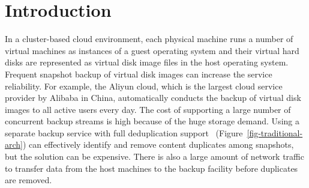 \section{Introduction}
In a cluster-based cloud environment,
each physical machine runs a number  of virtual machines as  instances of a guest operating system 
and their  virtual hard disks are represented as virtual disk image files in the host operating system.
Frequent  snapshot backup of virtual disk images  can increase  the service reliability. 
For example, the Aliyun cloud, which is  the largest cloud service provider by Alibaba in China, 
automatically conducts  the backup of virtual disk images to all active users every day.
The cost of supporting a large number of concurrent backup streams is high
because of the huge storage demand. 
Using a separate  backup service with full deduplication support~\cite{venti02,bottleneck08}
(Figure~\ref{fig-traditional-arch})
can effectively identify and remove content duplicates among snapshots, 
but the solution can be expensive. There is also a large amount of 
network traffic to transfer  data from the host machines to the backup facility
before duplicates are removed.



